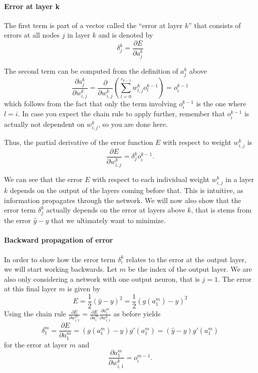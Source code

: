 \documentclass[paper=6.14in:9.21in,pagesize=pdftex,11pt,twoside,openright]{scrbook}
\begin{document}
\paragraph{Error at layer k}
The first term is part of a vector called the ``error at layer $k$''  that consists of errors at all nodes $j$ in layer $k$ and is denoted by 
\begin{equation}
\delta^k_j=\frac{\partial E}{\partial a_j^k}
\end{equation}

The second term can be computed from the definition of $a_j^k$ above
\begin{equation}
\frac{\partial a^k_j}{\partial w_{i,j}^k}=\frac{\partial}{\partial w_{i,j}^k}\left(\sum_{l=0}^{r_{k-1}} w_{l,j}^k o^{k-1}_l\right)=o^{k-1}_i
\end{equation}
which follows from the fact that only the term involving $o^{k-1}_i$ is the one where $l=i$. In case you expect the chain rule to apply further, remember that $o^{k-1}_i$ is actually not dependent on $w_{i,j}^k$, so you are done here.

Thus, the partial derivative of the error function $E$ with respect to weight $w_{i,j}^k$ is
\begin{equation}
\frac{\partial E}{\partial w^k_{i,j}}=\delta^k_jo^{k-1}_i.
\end{equation}

We can see that the error $E$ with respect to each individual weight $w_{i,j}^k$ in a layer $k$ depends on the output of the layers coming before that. This is intuitive, as information propagates through the network. We will now also show that the error term $\delta_j^k$ actually depends on the error at layers above $k$, that is stems from the error $\hat{y}-y$ that we ultimately want to minimize. 

\paragraph{Backward propagation of error}

In order to show how the error term $\delta^k_i$ relates to the error  at the output layer, we will start working backwards. Let $m$ be the index of the output layer. We are also only considering a network with one output neuron, that is $j=1$. The error at this final layer $m$ is given by
\begin{equation}
E=\frac{1}{2}(\hat{y}-y)^2=\frac{1}{2}(g(a_1^m)-y)^2
\end{equation}
Using the chain rule $\frac{\partial E}{\partial w_{i,1}^m}=\frac{\partial E}{\partial a^m_i}\frac{\partial a^m_i}{\partial w^k_{i,1}}$ as before yields 
\begin{equation}
\delta^m_1=\frac{\partial E}{\partial a^m_1}=(g(a^m_1)-y)g'(a^m_1)=(\hat{y}-y)g'(a^m_1)
\end{equation}
for the error at layer $m$ and
\begin{equation}
\frac{\partial a^m_1}{\partial w^k_{i,1}}=o_i^{m-1}.
\end{equation}
\end{document}
